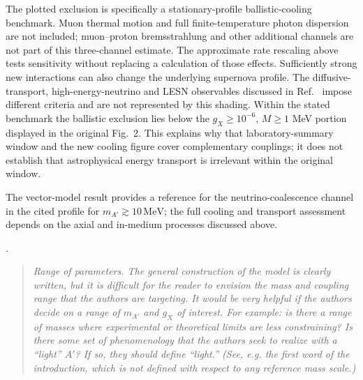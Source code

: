 \documentclass[12pt,a4paper]{article}
\begin{document}
The plotted exclusion is specifically a stationary-profile ballistic-cooling benchmark. Muon thermal motion and full finite-temperature photon dispersion are not included; muon--proton bremsstrahlung and other additional channels are not part of this three-channel estimate. The approximate rate rescaling above tests sensitivity without replacing a calculation of those effects. Sufficiently strong new interactions can also change the underlying supernova profile. The diffusive-transport, high-energy-neutrino and LESN observables discussed in Ref.~\cite{Blinov:2025aha} impose different criteria and are not represented by this shading. Within the stated benchmark the ballistic exclusion lies below the \(g_X\geq10^{-6}\), \(M\geq1\) MeV portion displayed in the original Fig.~2. This explains why that laboratory-summary window and the new cooling figure cover complementary couplings; it does not establish that astrophysical energy transport is irrelevant within the original window.

\medskip
{}

The vector-model result provides a reference for the neutrino-coalescence channel in the cited profile for \(m_{A'}\gtrsim10\,\mathrm{MeV}\); the full cooling and transport assessment depends on the axial and in-medium processes discussed above.

\medskip
{}. \begin{quote}\itshape
Range of parameters. The general construction of the model is clearly written, but it is difficult for the reader to envision the mass and coupling range that the authors are targeting. It would be very helpful if the authors decide on a range of \(m_{A'}\) and \(g_X\) of interest. For example: is there a range of masses where experimental or theoretical limits are less constraining? Is there some set of phenomenology that the authors seek to realize with a ``light'' \(A'\)? If so, they should define ``light.'' (See, e.g. the first word of the introduction, which is not defined with respect to any reference mass scale.)\end{quote}
\end{document}
